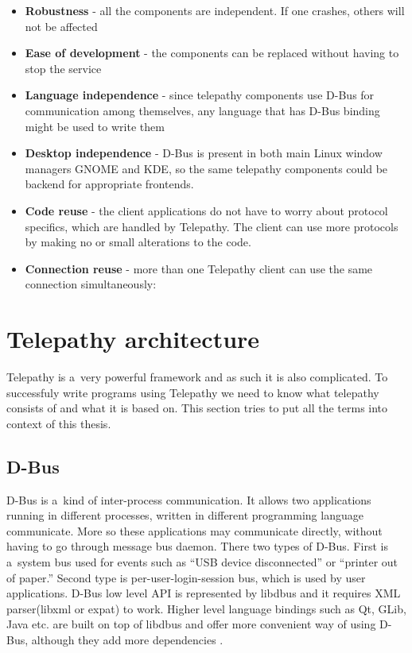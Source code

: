 \begin{itemize}

	\item {\bf Robustness} - all the components are independent. If one crashes, others will not be affected

	\item {\bf Ease of development} - the components can be replaced without having to stop the service 

	\item {\bf Language independence} - since telepathy components use D-Bus for communication among themselves, any language that has D-Bus binding might be used to write them

	\item {\bf Desktop independence} - D-Bus is present in both main Linux window managers GNOME and KDE, so the same telepathy components could be backend for appropriate frontends.

	\item {\bf Code reuse} - the client applications do not have to worry about protocol specifics, which are handled by Telepathy. The client can use more protocols by making no or small alterations to the code.

	\item {\bf Connection reuse} - more than one Telepathy client can use the same connection simultaneously:
\end{itemize}

\section{Telepathy architecture}
Telepathy is a~very powerful framework and as such it is also complicated. To successfuly write programs using Telepathy we need to know what telepathy consists of and what it is based on. This section tries to put all the terms into context of this thesis.  

\subsection*{D-Bus}
D-Bus is a~kind of inter-process communication. It allows two applications running in different processes, written in different programming language communicate. More so these applications may communicate directly, without having to go through message bus daemon. There two types of D-Bus. First is a~system bus used for events such as ``USB device disconnected'' or ``printer out of paper.'' Second type is per-user-login-session bus, which is used by user applications. D-Bus low level API is represented by libdbus and it requires XML parser(libxml or expat) to work. Higher level language bindings such as Qt, GLib, Java etc. are built on top of libdbus and offer more convenient way of using D-Bus, although they add more dependencies \cite{dbus,TPWiki}.

